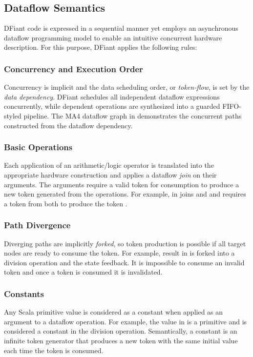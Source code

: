 \subsection{Dataflow Semantics}
DFiant code is expressed in a sequential manner yet employs an asynchronous dataflow programming model to enable an intuitive concurrent hardware description. For this purpose, DFiant applies the following rules:

\subsubsection{Concurrency and Execution Order} 
Concurrency is implicit and the data scheduling order, or \textit{token-flow}, is set by the \textit{data dependency}. DFiant schedules all independent dataflow expressions concurrently, while dependent operations are synthesized into a guarded FIFO-styled pipeline. The MA4 dataflow graph in  demonstrates the concurrent paths constructed from the dataflow dependency. 

\subsubsection{Basic Operations} 
Each application of an arithmetic/logic operator is translated into the appropriate hardware construction and applies a dataflow \emph{join} on their arguments. The arguments require a valid token for consumption to produce a new token generated from the operations. For example, \code{+} in  joins  and  and requires a token from both to produce the token .

\subsubsection{Path Divergence} 
Diverging paths are implicitly \emph{forked}, so token production is possible if all target nodes are ready to consume the token. For example,  result in  is forked into a division operation and the state feedback.	It is impossible to consume an invalid token and once a token is consumed it is invalidated.

\subsubsection{Constants} 
Any Scala primitive value is considered as a constant when applied as an argument to a dataflow operation. For example, the value  in  is a primitive  and is considered a constant in the division operation. Semantically, a constant is an infinite token generator that produces a new token with the same initial value each time the token is consumed.

